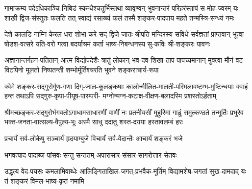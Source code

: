 \fourlineindentedshloka
{गामाक्रम्य पदेऽधिकाञ्चि निबिडं स्कन्धैश्चतुर्भिस्तथा}
{व्यावृण्वन् भुवनान्तरं परिहरंस्तापं स-मोह-ज्वरम्}
{यः शाखी द्विज-संस्तुतः फलति तत् स्वाद्यं रसाख्यं फलं}
{तस्मै शङ्कर-पादपाय महते तन्मस्त्रि-सन्ध्यं नमः}


\fourlineindentedshloka
{देशे कालडि-नाम्नि केरल-धरा-शोभा-करे सद्-द्विजे}
{जातः श्रीपति-मन्दिरस्य सविधे सर्वज्ञतां प्राप्तवान्}
{भूत्वा षोडश-वत्सरे यति-वरो गत्वा बदर्याश्रमं}
{कर्ता भाष्य-निबन्धनस्य सु-कविः श्री-शङ्करः पावनः}


\fourlineindentedshloka
{अज्ञानान्तर्गहन-पतितान् आत्म-विद्योपदेशैः}
{त्रातुं लोकान् भव-दव-शिखा-ताप-पापच्यमानान्}
{मुक्त्वा मौनं वट-विटपिनो मूलतो निष्पतन्ती}
{शम्भोर्मूर्तिश्चरति भुवने शङ्कराचार्य-रूपा}


\fourlineindentedshloka
{क्वेमे शङ्कर-सद्गुरोर्गुण-गणा दिग्-जाल-कूलङ्कषाः}
{कालोन्मीलित-मालती-परिमलावष्टम्भ-मुष्टिन्धयाः}
{क्वाहं हन्त तथाऽपि सद्गुरु-कृपा-पीयूष-पारम्परी-}
{मग्नोन्मग्न-कटाक्ष-वीक्षण-बलादस्मि प्रशस्तोऽर्हताम्}


\fourlineindentedshloka
{श्रीमच्छङ्कर-सद्गुरोर्भगवतोऽगाधामसाधारणीं}
{वाणीं नः प्रतनीयसीं मुहुरिमां गाढुं समुत्कण्ठते}
{तन्मूर्तिः प्रभुरेव भक्त-जनता-वात्सल्य-वैपुल्य-भूः}
{अस्मै साधु ददातु शस्त-दयया हस्तावलम्बं हरः}




\twolineshloka
{प्रचार्यं सर्व-लोकेषु सञ्चार्यं हृदयाम्बुजे}
{विचार्यं सर्व-वेदान्तैः आचार्यं शङ्करं भजे}


\twolineshloka
{भगवत्पाद-पादाब्ज-पांसवः सन्तु सन्ततम्}
{अपारासार-संसार-सागरोत्तार-सेतवः}


\fourlineindentedshloka
{उद्धृत्य वेद-पयसः कमलामिवाब्धेः}
{आलिङ्गिताखिल-जगत्-प्रभवैक-मूर्तिम्}
{विद्यामशेष-जगतां सुख-दामदाद् यः}
{तं शङ्करं विमल-भाष्य-कृतं नमामि}


